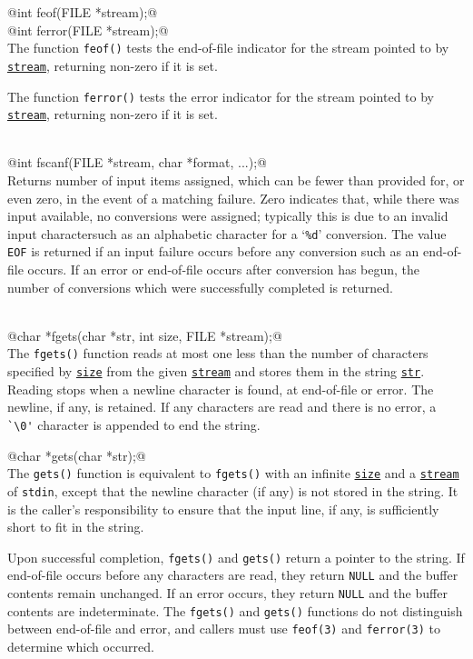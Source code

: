 \documentclass[11pt,twocolumn]{scrartcl}
\newcommand{\ul}[1]{\underline{\texttt{#1}}}
\begin{document}
@int feof(FILE *stream);@\\
@int ferror(FILE *stream);@\\
The function \verb|feof()| tests the end-of-file indicator for the stream
pointed to by \ul{stream}, returning non-zero if it is set.

The function \verb|ferror()| tests the error indicator for the stream pointed to
by \ul{stream}, returning non-zero if it is set.

\hfill\\
@int fscanf(FILE *stream, char *format, ...);@\\
Returns number of input items assigned, which can be fewer than provided for, or even zero,
in the event of a matching failure. Zero indicates that, while there was input available,
no conversions were assigned; typically this is due to an invalid input charactersuch as an alphabetic character for a `\verb|%d|' conversion.
The value \verb|EOF| is returned if an input failure occurs before any conversion
such as an end-of-file occurs.  If an error or end-of-file occurs after
conversion has begun, the number of conversions which were successfully
completed is returned.

\hfill\\
@char *fgets(char *str, int size, FILE *stream);@\\
The \verb|fgets()| function reads at most one less than the number of characters
specified by \ul{size} from the given \ul{stream} and stores them in the string
\ul{str}.  Reading stops when a newline character is found, at end-of-file or
error.  The newline, if any, is retained.  If any characters are read and
there is no error, a \verb|`\0'| character is appended to end the string.

@char *gets(char *str);@\\
The \verb|gets()| function is equivalent to \verb|fgets()| with an infinite \ul{size} and a
\ul{stream} of \verb|stdin|, except that the newline character (if any) is not stored
in the string. It is the caller's responsibility to ensure that the
input line, if any, is sufficiently short to fit in the string.

Upon successful completion, \verb|fgets()| and \verb|gets()| return a pointer to the
string.  If end-of-file occurs before any characters are read, they
return \verb|NULL| and the buffer contents remain unchanged.  If an error
occurs, they return \verb|NULL| and the buffer contents are indeterminate.  The
\verb|fgets()| and \verb|gets()| functions do not distinguish between end-of-file and
error, and callers must use \verb|feof(3)| and \verb|ferror(3)| to determine which
occurred.
\end{document}
